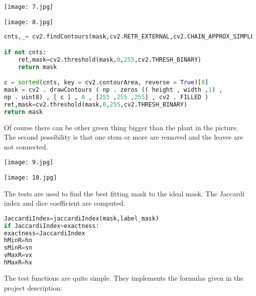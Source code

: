 \documentclass[12pt]{article}
\begin{document}
\vspace{5mm}
\begin{center}
	\texttt{[image: 7.jpg]}
\end{center}
\begin{center}
	\texttt{[image: 8.jpg]}
\end{center}
\begin{lstlisting}[language=Python]
cnts,_= cv2.findContours(mask,cv2.RETR_EXTERNAL,cv2.CHAIN_APPROX_SIMPLE)

if not cnts:
	ret,mask=cv2.threshold(mask,0,255,cv2.THRESH_BINARY)
	return mask

c = sorted(cnts, key = cv2.contourArea, reverse = True)[0]
mask = cv2 . drawContours ( np . zeros (( height , width ,1) ,
np . uint8) , [ c ] , 0 , [255 ,255 ,255] , cv2 . FILLED )
ret,mask=cv2.threshold(mask,0,255,cv2.THRESH_BINARY)
return mask
\end{lstlisting}
\newpage
Of course there can be other green thing bigger than the plant in the picture. The second possibility is that one stem or more are removed and the leaves are not connected.\\

\begin{center}
	\texttt{[image: 9.jpg]}
\end{center}
\begin{center}
	\texttt{[image: 10.jpg]}
\end{center}
The tests are used to find the best fitting mask to the ideal mask. The Jaccardi index and dice coefficient are computed. \\
\begin{lstlisting}[language=Python]
JaccardiIndex=jaccardiIndex(mask,label_mask)
if JaccardiIndex>exactness:
exactness=JaccardiIndex
hMinR=hn
sMinR=sn
vMaxR=vx
hMaxR=hx
\end{lstlisting}
\newpage
The test functions are quite simple. They implements the formulas given in the project description:
\vspace{5mm}
\end{document}
